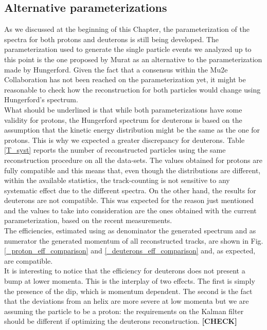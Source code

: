 \documentclass[12pt,a4paper,openright, oneside, titlepage]{book} %
\begin{document}
\subsection{Alternative parameterizations}
As we discussed at the beginning of this Chapter, 
the parameterization of the spectra for both protons and deuterons is still being developed. 
The parameterization used to generate the single particle events we analyzed up to this point is the one proposed by Murat as an alternative to the parameterization made by Hungerford. 
Given the fact that a consensus within the Mu2e Collaboration has not been reached on the parameterization yet, 
it might be reasonable to check how the reconstruction for both particles would change using Hungerford's spectrum.\\
What should be underlined is that while both parameterizations have some validity for protons, 
the Hungerford spectrum for deuterons is based on the assumption that the kinetic energy distribution 
might be the same as the one for protons. 
This is why we expected a greater discrepancy for deuterons. 
Table \ref{T_syst} reports the number of reconstructed particles using the same reconstruction procedure on all the data-sets. 
The values obtained for protons are fully compatible and this means that, 
even though the distributions are different, 
within the available statistics, 
the track-counting is not sensitive to any systematic effect due to the different spectra.
On the other hand, the results for deuterons are not compatible. 
This was expected for the reason just mentioned and the values to take into consideration are the ones obtained with the current parameterization, based on the recent measurements.\\
The efficiencies, estimated using as denominator the generated spectrum and as numerator the generated momentum of all reconstructed tracks, are shown in Fig. \ref{_proton_eff_comparison} and \ref{_deuterons_eff_comparison} and, as expected, are compatible.\\

\noindent It is interesting to notice that the efficiency for deuterons does not present a bump at lower momenta. This is the interplay of two effects. The first is simply the presence of the dip, which is momentum dependent. The second is the fact that the deviations from an helix are more severe at low momenta but we are assuming the particle to be a proton: the requirements on the Kalman filter should be different if optimizing the deuterons reconstruction. \textbf{[CHECK]}
\end{document}
